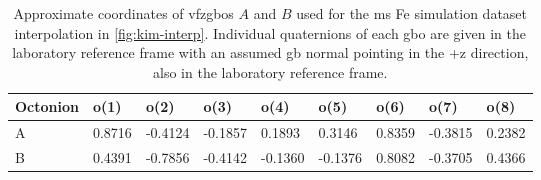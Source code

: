 \documentclass[final,twocolumn,12pt]{elsarticle}
\begin{document}
%
\begin{table}
\centering
\caption{Approximate coordinates of \glspl{vfzgbo} $A$ and $B$ used for the \gls{ms} Fe simulation dataset interpolation in \cref{fig:kim-interp}. Individual quaternions of each \gls{gbo} are given in the laboratory reference frame with an assumed \gls{gb} normal pointing in the +z direction, also in the laboratory reference frame.}
\label{tab:tunnel-AB2}
\begin{tabular}{lllllllll}
\hline
Octonion & o(1)   & o(2)    & o(3)    & o(4)    & o(5)    & o(6)   & o(7)    & o(8)   \\ \hline
A        & 0.8716 & -0.4124 & -0.1857 & 0.1893  & 0.3146  & 0.8359 & -0.3815 & 0.2382 \\
B        & 0.4391 & -0.7856 & -0.4142 & -0.1360 & -0.1376 & 0.8082 & -0.3705 & 0.4366 \\ \hline
\end{tabular}
\end{table}
%
%
\end{document}
